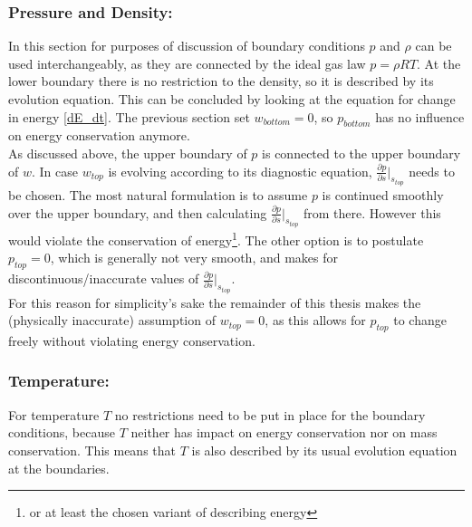 \subsubsection{Pressure and Density:}
In this section for purposes of discussion of boundary conditions $p$ and $\rho$ can be used interchangeably, as they are connected by the ideal gas law $p=\rho RT$.
At the lower boundary there is no restriction to the density, so it is described by its evolution equation.
This can be concluded by looking at the equation for change in energy \ref{dE_dt}.
The previous section set $w_{bottom}=0$, so $p_{bottom}$ has no influence on energy conservation anymore.\\
As discussed above, the upper boundary of $p$ is connected to the upper boundary of $w$.
In case $w_{top}$ is evolving according to its diagnostic equation, $\frac{\partial p}{\partial s}\rvert _{s_{top}}$ needs to be chosen.
The most natural formulation is to assume $p$ is continued smoothly over the upper boundary, and then calculating $\frac{\partial p}{\partial s}\rvert _{s_{top}}$ from there.
However this would violate the conservation of energy\footnote{or at least the chosen variant of describing energy}.
The other option is to postulate $p_{top}=0$, which is generally not very smooth, and makes for discontinuous/inaccurate values of $\frac{\partial p}{\partial s}\rvert _{s_{top}}$.\\
For this reason for simplicity's sake the remainder of this thesis makes the (physically inaccurate) assumption of $w_{top}=0$, as this allows for $p_{top}$ to change freely without violating energy conservation.
\subsubsection{Temperature:}
For temperature $T$ no restrictions need to be put in place for the boundary conditions, because $T$ neither has impact on energy conservation nor on mass conservation.
This means that $T$ is also described by its usual evolution equation at the boundaries.

